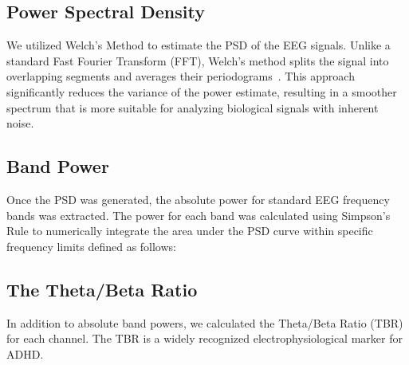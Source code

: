\documentclass[11pt,a4paper]{article}
\begin{document}
\subsection{Power Spectral Density}
We utilized Welch's Method to estimate the PSD of the EEG signals. Unlike a standard Fast Fourier Transform (FFT), Welch's method splits the 
signal into overlapping segments and averages their periodograms~\cite{welch2003use}. This approach significantly reduces the variance of the 
power estimate, resulting in a smoother spectrum that is more suitable for analyzing biological signals with inherent noise.


\subsection{Band Power}
Once the PSD was generated, the absolute power for standard EEG frequency bands was extracted. The power for each band was calculated using 
Simpson's Rule to numerically integrate the area under the PSD curve within specific frequency limits defined as follows:

\begin{table}[H]
    \centering
    \caption{EEG Frequency Bands and associated cognitive states}
    \label{tab:bands}
\end{table}


\subsection{The Theta/Beta Ratio}
In addition to absolute band powers, we calculated the Theta/Beta Ratio (TBR) for each channel. The TBR is a widely recognized 
electrophysiological marker for ADHD.
\end{document}
